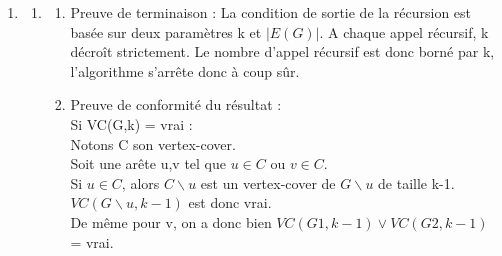 \documentclass[]{article}
\begin{document}
\begin{enumerate}
\begin{enumerate}
\end{enumerate}
\vspace*{7mm}
\item
\begin{enumerate}
\item
\begin{enumerate}
\item Preuve de terminaison : La condition de sortie de la récursion est basée sur deux paramètres k et $|E(G)|$. A chaque appel récursif, k décroît strictement. Le nombre d'appel récursif est donc borné par k, l'algorithme s'arrête donc à coup sûr.\\
\item Preuve de conformité du résultat : \\

Si VC(G,k) = vrai :\\
Notons C son vertex-cover. \\
Soit une arête {u,v} tel que $u\in C$ ou $v\in C$.\\
Si $u\in C$, alors $C\backslash{u}$ est un vertex-cover de $G\backslash{u}$ de taille k-1.\\
$VC(G\backslash{u}, k-1)$ est donc vrai.\\
De même pour v, on a donc bien $VC(G1,k-1)\vee VC(G2,k-1)$ = vrai.\\


\end{enumerate}
\end{enumerate}
\end{enumerate}
\end{document}
